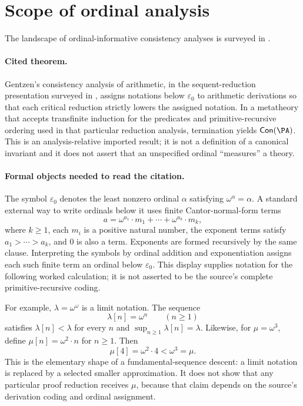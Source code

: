 \section{Scope of ordinal analysis}
\label{sec:normalization-curry-howard-04}

The landscape of ordinal-informative consistency analyses is surveyed in
\cite{Buss1998}.

\paragraph{Cited theorem.}
Gentzen's consistency analysis of arithmetic, in the sequent-reduction
presentation surveyed in
\cite[Chapter~10, especially Sections~10.1--10.4, pp.~318--337]
     {TroelstraSchwichtenberg2000}, assigns notations below
\(\varepsilon_0\) to arithmetic derivations so that each critical reduction
strictly lowers the assigned notation.  In a metatheory that accepts
transfinite induction for the predicates and primitive-recursive ordering used
in that particular reduction analysis, termination yields
\(\mathsf{Con}(\PA)\).  This is an analysis-relative imported result;
it is not a definition of a canonical invariant and it does not assert that an
unspecified ordinal ``measures'' a theory.

\paragraph{Formal objects needed to read the citation.}
The symbol \(\varepsilon_0\) denotes the least nonzero ordinal
\(\alpha\) satisfying \(\omega^\alpha=\alpha\).  A standard external way to
write ordinals below it uses finite Cantor-normal-form terms
\[
  a=\omega^{a_1}\cdot m_1+\cdots+
    \omega^{a_k}\cdot m_k,
\]
where \(k\geq1\), each \(m_i\) is a positive natural number, the exponent
terms satisfy \(a_1>\cdots>a_k\), and \(0\) is also a term.  Exponents are
formed recursively by the same clause.  Interpreting the symbols by ordinal
addition and exponentiation assigns each such finite term an ordinal below
\(\varepsilon_0\).  This display supplies notation for the following worked
calculation; it is not asserted to be the source's complete primitive-recursive
coding.

For example, \(\lambda=\omega^\omega\) is a limit notation.  The sequence
\[
  \lambda[n]=\omega^n\qquad(n\geq1)
\]
satisfies \(\lambda[n]<\lambda\) for every \(n\) and
\(\sup_{n\geq1}\lambda[n]=\lambda\).  Likewise, for
\(\mu=\omega^3\), define \(\mu[n]=\omega^2\cdot n\) for \(n\geq1\).  Then
\[
  \mu[4]=\omega^2\cdot4<\omega^3=\mu.
\]
This is the elementary shape of a fundamental-sequence descent: a limit
notation is replaced by a selected smaller approximation.  It does not show
that any particular proof reduction receives \(\mu\), because that claim
depends on the source's derivation coding and ordinal assignment.

